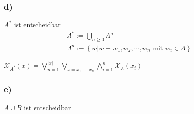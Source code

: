 \documentclass[a4paper,12pt]{article}
\begin{document}
	\subsubsection*{d)}
	$A^*$ ist entscheidbar
	\begin{align*}
		&A^* := \bigcup \limits_{n \geq 0} A^n\\
		&A^n := \left\lbrace w | w = w_1,w_2,\cdots,w_n \text{ mit } w_i \in A\right\rbrace
	\end{align*}
	\begin{center}
		$\mathcal{X}_{A^*} \left(x\right) = \bigvee \limits_{n=1} ^{\left|x\right|} \bigvee \limits_{x=x_1,\cdots,x_n} \bigwedge \limits_{i=1}^{n} \mathcal{X}_{A} \left(x_i\right)$
	\end{center}
	\newpage
	
	\subsubsection*{e)}
	$A \cup B$ ist entscheidbar
\end{document}
